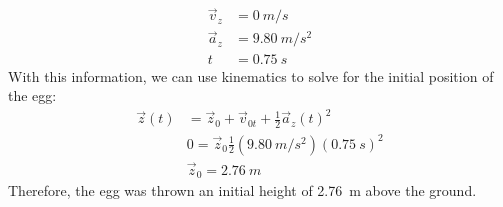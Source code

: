 \begin{solution}
\begin{parts}
		\begin{align*}
		\vec v_{z}& = \SI{0}{m/s}\\
		\vec a_z& = \SI{9.80}{m/s^2}\\
		t& = \SI{0.75}{s}
		\end{align*}
		With this information, we can use kinematics to solve for the initial position of the egg:
		\begin{align*}
		\vec z(t)&= \vec z_0 + \vec v_{0t} + \frac{1}{2}\vec a_z(t)^2\\
		&0 = \vec z_0 \frac{1}{2}(\SI{9.80}{m/s^2})(\SI{0.75}{s})^2\\
		&\vec z_0 = \SI{2.76}{m}
		\end{align*}
		Therefore, the egg was thrown an initial height of \SI{2.76}{m} above the ground.
	\end{parts}
\end{solution}